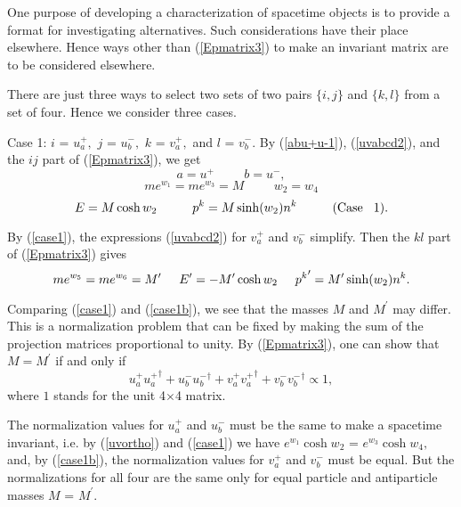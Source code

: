 \documentclass[a4paper,12pt]{article}
\begin{document}
	One purpose of developing a characterization of spacetime objects is to provide a format for investigating alternatives. Such considerations have their place elsewhere. Hence ways other than (\ref{Epmatrix3}) to make an invariant matrix are to be considered elsewhere. 

	There are just three ways to select two sets of two pairs $\{i,j\}$ and $\{k,l\}$ from a set of four. Hence we consider three cases.

	Case 1: $i$ = $u^{+}_{a},$ $j$ = $u^{-}_{b},$ $k$ = $ v_{a}^{+},$ and $l$ = $ v_{b}^{-}.$ By (\ref{abu+u-1}), (\ref{uvabcd2}), and the $ij$ part of (\ref{Epmatrix3}), we get %
\begin{equation}	\label{case1}
 a =  u^{+}  \hspace{1cm} b = u^{-}, 
\end{equation}
$$m e^{w_{1}} = m e^{w_{3}} =  M \hspace{1cm} w_{2} = w_{4} $$ $$ E = M \cosh w_{2} \hspace{1cm} p^{k} =  M \sinh (w_{2}) n^{k} \hspace{1cm}  {\mathrm{(Case}} \hspace{0.3cm} {\mathrm{1)}}. $$

	By (\ref{case1}), the expressions (\ref{uvabcd2}) for $v_{a}^{+}$ and $ v_{b}^{-}$ simplify. Then the $kl$ part of (\ref{Epmatrix3}) gives
\begin{equation}	\label{case1b}
 m e^{w_{5}} = m e^{w_{6}} =  M^{\prime} \hspace{0.5cm}  E^{\prime} = -  M^{\prime} \cosh w_{2} \hspace{0.5cm} {p^{k}}^{\prime} =  M^{\prime} \sinh (w_{2}) n^{k} .
\end{equation}

	Comparing (\ref{case1}) and (\ref{case1b}), we see that the masses $M $ and $M^{\prime}$ may differ. This is a normalization problem that can be fixed by making the sum of the projection matrices proportional to unity. By (\ref{Epmatrix3}), one can show that $M = M^{\prime}$ if and only if
\begin{equation}	\label{case1c}
 u^{+}_{a} {u^{+}_{a}}^{\dagger} + u^{-}_{b} {u^{-}_{b}}^{\dagger} + v^{+}_{a} {v^{+}_{a}}^{\dagger} + v^{-}_{b} {v^{-}_{b}}^{\dagger} \propto 1,
\end{equation}
where $1$ stands for the unit 4$\times$4 matrix.

	The normalization values for $u^{+}_{a}$ and $ u^{-}_{b}$ must be the same to make a spacetime invariant, i.e. by (\ref{uvortho}) and (\ref{case1}) we have $e^{w_{1}} \cosh w_{2}$ = $e^{w_{3}} \cosh w_{4},$ and, by (\ref{case1b}), the normalization values for $v^{+}_{a}$ and $ v^{-}_{b}$ must be equal. But the normalizations for all four are the same only for equal particle and antiparticle masses $M$ = $M^{\prime}.$
\end{document}
